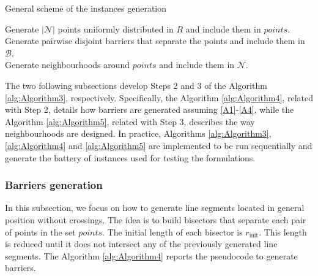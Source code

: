 \documentclass[a4paper,  review, authoryear, 1p.]{elsarticle}
\newcommand{\CV}[1]{{\color{red}#1}}
\begin{document}
\begin{algorithm}[H]
	\caption{General scheme of the instances generation}
	\label{alg:Algorithm3}
	
	Generate $|\mathcal N|$ points uniformly distributed in $R$ and include them in $points$. \\
	Generate pairwise disjoint barriers that separate the points and include them in $\mathcal B$. \\
	Generate neighbourhoods around $points$ and include them in $\mathcal N$. 
\end{algorithm}

\CV{The two following subsections develop Steps 2 and 3 of the Algorithm \ref{alg:Algorithm3}, respectively. Specifically, the Algorithm \ref{alg:Algorithm4}, related with Step 2, details how barriers are generated assuming \ref{A1}-\ref{A4}, while the Algorithm \ref{alg:Algorithm5}, related with Step 3, describes the way neighbourhoods are designed. In practice, Algorithms \ref{alg:Algorithm3}, \ref{alg:Algorithm4} and \ref{alg:Algorithm5} are implemented to be run sequentially and generate the battery of instances used for testing the formulations.}

\subsubsection*{Barriers generation}
In this subsection, we focus on how to generate line segments located in general position without crossings. The idea is to build bisectors that separate each pair of points in the set $points$. The initial length of each bisector is $r_{\text{init}}$. This length is reduced until it does not intersect any of the previously generated line segments. The Algorithm \ref{alg:Algorithm4} reports the pseudocode to generate barriers.
\end{document}
